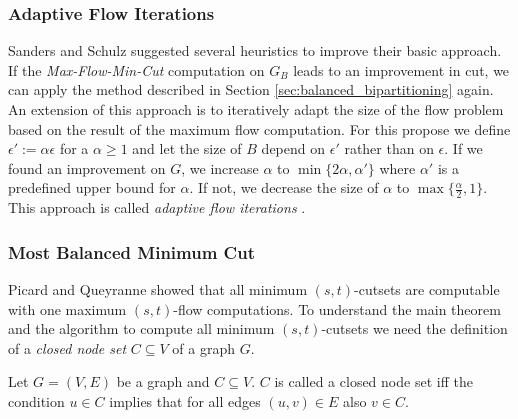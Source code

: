 \subsubsection{Adaptive Flow Iterations}
\label{sec:adaptive_flow_iterations}

Sanders and Schulz \cite{sanders2011engineering} suggested several heuristics to improve
their basic approach. If the \emph{Max-Flow-Min-Cut} computation on $G_B$ leads to an
improvement in cut, we can apply the method described in Section 
\ref{sec:balanced_bipartitioning} again. An extension of this approach is to iteratively adapt the
size of the flow problem based on the result of the maximum flow computation. For this propose
we define $\epsilon' := \alpha\epsilon$ for a $\alpha \ge 1$ and let the size of $B$ depend
on $\epsilon'$ rather than on $\epsilon$. If we found an improvement on $G$, we
increase $\alpha$ to $\min\{2\alpha, \alpha'\}$ where $\alpha'$ is a predefined upper bound
for $\alpha$. If not, we decrease the size of $\alpha$ to 
$\max\{\frac{\alpha}{2},1\}$. This approach is called
\emph{adaptive flow iterations} \cite{sanders2011engineering}.

\subsubsection{Most Balanced Minimum Cut}
\label{sec:related_mbmc}

Picard and Queyranne \cite{picard1980structure} showed that all minimum $(s,t)$-cutsets 
are computable with one maximum $(s,t)$-flow computations.
To understand the main theorem and the algorithm to compute all minimum $(s,t)$-cutsets we
need the definition of a \emph{closed node set} $C \subseteq V$ of a graph $G$.

\begin{definition}
Let $G = (V,E)$ be a graph and $C \subseteq V$. $C$ is called a closed node set iff the 
condition $u \in C$ implies that for all edges $(u,v) \in E$ also $v \in C$.
\end{definition}

